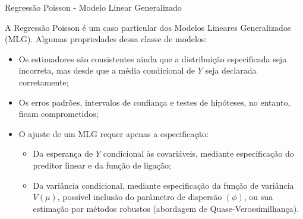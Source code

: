 \documentclass[10pt, aspectratio=169]{beamer}
\begin{document}
\begin{frame}{Regressão Poisson - Modelo Linear Generalizado} 


A Regressão Poisson é um caso particular dos Modelos Lineares Generalizados (MLG). Algumas propriedades dessa classe de modelos:

\begin{itemize}

\item Os estimadores são consistentes ainda que a distribuição especificada seja incorreta, mas desde que a média condicional de $Y$ seja declarada corretamente;

\item Os erros padrões, intervalos de confiança e testes de hipóteses, no entanto, ficam comprometidos;

\item O ajuste de um MLG requer apenas a especificação:

\begin{itemize}
\item Da esperança de $Y$ condicional às covariáveis, mediante especificação do preditor linear e da função de ligação;

\item Da variância condicional, mediante especificação da função de variância $V(\mu)$, possível inclusão do parâmetro de dispersão $(\phi)$, ou sua estimação por métodos robustos (abordagem de Quase-Verossimilhança).

\end{itemize}

\end{itemize}

\end{frame}



\end{document}
